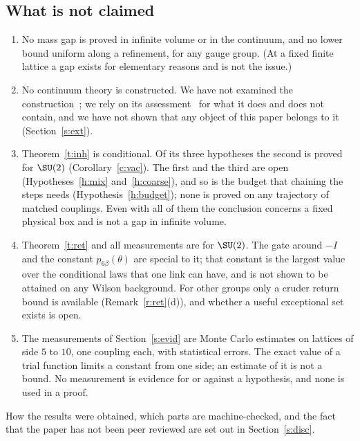 \subsection{What is not claimed}\label{s:not}
\begin{enumerate}
\item No mass gap is proved in infinite volume or in the continuum, and no lower bound uniform along a
refinement, for any gauge group. (At a fixed finite lattice a gap exists for elementary reasons and is not
the issue.)
\item No continuum theory is constructed. We have not examined the construction~\cite{OAI}; we rely on its
assessment~\cite{YMG} for what it does and does not contain, and we have not shown that any object of this
paper belongs to it (Section~\ref{s:ext}).
\item Theorem~\ref{t:inh} is conditional. Of its three hypotheses the second is proved for $\SU(2)$
(Corollary~\ref{c:vac}). The first and the third are open (Hypotheses~\ref{h:mix} and~\ref{h:coarse}), and so
is the budget that chaining the steps needs (Hypothesis~\ref{h:budget}); none is proved on any trajectory of
matched couplings. Even with all of them the conclusion concerns a fixed physical box and is not a gap in
infinite volume.
\item Theorem~\ref{t:ret} and all measurements are for $\SU(2)$. The gate around $-I$ and the constant $p_{6\beta}(\theta)$
are special to it; that constant is the largest value over the conditional laws that one link can have, and
is not shown to be attained on any Wilson background. For other groups only a cruder return bound is available (Remark~\ref{r:ret}(d)), and
whether a useful exceptional set exists is open.
\item The measurements of Section~\ref{s:evid} are Monte Carlo estimates on lattices of side $5$ to $10$,
one coupling each, with statistical errors. The exact value of a trial function limits a constant from one
side; an estimate of it is not a bound. No measurement is evidence for or against a hypothesis, and none is
used in a proof.
\end{enumerate}

How the results were obtained, which parts are machine-checked, and the fact that the paper has not been
peer reviewed are set out in Section~\ref{s:disc}.
